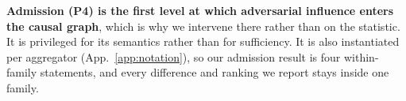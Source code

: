\documentclass{article}
\begin{document}
\noindent \textbf{Admission (P4) is the first level at which adversarial influence enters the causal graph}, which is why we intervene there rather than on the statistic. It is privileged for its semantics rather than for sufficiency. It is also instantiated per aggregator (App.~\ref{app:notation}), so our admission result is four within-family statements, and every difference and ranking we report stays inside one family.

\end{document}
